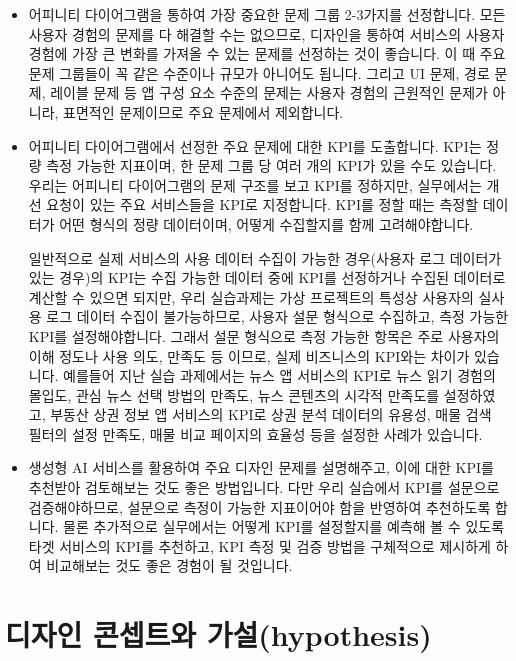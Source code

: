 \documentclass[
  letterpaper,
]{book}
\begin{document}
\begin{itemize}
\item
  어피니티 다이어그램을 통하여 가장 중요한 문제 그룹 2-3가지를
  선정합니다. 모든 사용자 경험의 문제를 다 해결할 수는 없으므로,
  디자인을 통하여 서비스의 사용자 경험에 가장 큰 변화를 가져올 수 있는
  문제를 선정하는 것이 좋습니다. 이 때 주요 문제 그룹들이 꼭 같은
  수준이나 규모가 아니어도 됩니다. 그리고 UI 문제, 경로 문제, 레이블
  문제 등 앱 구성 요소 수준의 문제는 사용자 경험의 근원적인 문제가
  아니라, 표면적인 문제이므로 주요 문제에서 제외합니다.
\item
  어피니티 다이어그램에서 선정한 주요 문제에 대한 KPI를 도출합니다.
  KPI는 정량 측정 가능한 지표이며, 한 문제 그룹 당 여러 개의 KPI가 있을
  수도 있습니다. 우리는 어피니티 다이어그램의 문제 구조를 보고 KPI를
  정하지만, 실무에서는 개선 요청이 있는 주요 서비스들을 KPI로
  지정합니다. KPI를 정할 때는 측정할 데이터가 어떤 형식의 정량
  데이터이며, 어떻게 수집할지를 함께 고려해야합니다.

  일반적으로 실제 서비스의 사용 데이터 수집이 가능한 경우(사용자 로그
  데이터가 있는 경우)의 KPI는 수집 가능한 데이터 중에 KPI를 선정하거나
  수집된 데이터로 계산할 수 있으면 되지만, 우리 실습과제는 가상
  프로젝트의 특성상 사용자의 실사용 로그 데이터 수집이 불가능하므로,
  사용자 설문 형식으로 수집하고, 측정 가능한 KPI를 설정해야합니다.
  그래서 설문 형식으로 측정 가능한 항목은 주로 사용자의 이해 정도나 사용
  의도, 만족도 등 이므로, 실제 비즈니스의 KPI와는 차이가 있습니다.
  예를들어 지난 실습 과제에서는 뉴스 앱 서비스의 KPI로 뉴스 읽기 경험의
  몰입도, 관심 뉴스 선택 방법의 만족도, 뉴스 콘텐츠의 시각적 만족도를
  설정하였고, 부동산 상권 정보 앱 서비스의 KPI로 상권 분석 데이터의
  유용성, 매물 검색 필터의 설정 만족도, 매물 비교 페이지의 효율성 등을
  설정한 사례가 있습니다.
\item
  생성형 AI 서비스를 활용하여 주요 디자인 문제를 설명해주고, 이에 대한
  KPI를 추천받아 검토해보는 것도 좋은 방법입니다. 다만 우리 실습에서
  KPI를 설문으로 검증해야하므로, 설문으로 측정이 가능한 지표이어야 함을
  반영하여 추천하도록 합니다. 물론 추가적으로 실무에서는 어떻게 KPI를
  설정할지를 예측해 볼 수 있도록 타겟 서비스의 KPI를 추천하고, KPI 측정
  및 검증 방법을 구체적으로 제시하게 하여 비교해보는 것도 좋은 경험이 될
  것입니다.
\end{itemize}

\chapter{디자인 콘셉트와
가설(hypothesis)}\label{uxb514uxc790uxc778-uxcf58uxc149uxd2b8uxc640-uxac00uxc124hypothesis}
\end{document}
